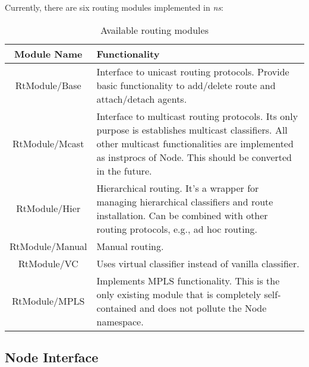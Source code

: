 Currently, there are six routing modules implemented in \emph{ns}:
\begin{table}[htbp]
  \begin{center}
    \begin{tabular}[htbp]{|c|p{5in}|}
      \hline
      Module Name & Functionality \\ 
      \hline \hline
      RtModule/Base & Interface to unicast routing protocols. Provide
        basic functionality to add/delete route and attach/detach
        agents. \\ \hline
      RtModule/Mcast & Interface to multicast routing protocols. Its
        only purpose is establishes multicast classifiers. All other
        multicast functionalities are implemented as instprocs of
        Node. This should be converted in the future. \\ \hline
      RtModule/Hier & Hierarchical routing. It's a wrapper for
        managing hierarchical classifiers and route installation. Can
        be combined with other routing protocols, e.g., ad hoc
        routing. \\ \hline
      RtModule/Manual & Manual routing. \\ \hline
      RtModule/VC & Uses virtual classifier instead of vanilla
        classifier. \\ \hline
      RtModule/MPLS & Implements MPLS functionality. This is the only
        existing module that is completely self-contained and does not
        pollute the Node namespace. \\
      \hline
    \end{tabular}
    \caption{Available routing modules}
    \label{tab:node:rtmodule}
  \end{center}
\end{table}

\subsection{Node Interface}


